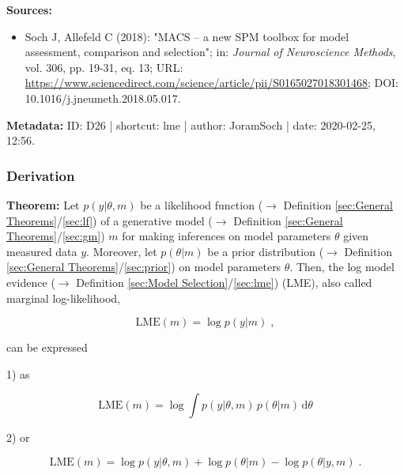 \documentclass[a4paper,12pt,twoside]{book}
\begin{document}
\vspace{1em}
\textbf{Sources:}
\begin{itemize}
\item Soch J, Allefeld C (2018): "MACS – a new SPM toolbox for model assessment, comparison and selection"; in: \textit{Journal of Neuroscience Methods}, vol. 306, pp. 19-31, eq. 13; URL: \url{https://www.sciencedirect.com/science/article/pii/S0165027018301468}; DOI: 10.1016/j.jneumeth.2018.05.017.
\end{itemize}


\vspace{1em}
\textbf{Metadata:} ID: D26 | shortcut: lme | author: JoramSoch | date: 2020-02-25, 12:56.
\vspace{1em}



\subsubsection[\textbf{Derivation}]{Derivation} \label{sec:lme-der}
\setcounter{equation}{0}

\textbf{Theorem:} Let $p(y \vert \theta,m)$ be a likelihood function ($\rightarrow$ Definition \ref{sec:General Theorems}/\ref{sec:lf}) of a generative model ($\rightarrow$ Definition \ref{sec:General Theorems}/\ref{sec:gm}) $m$ for making inferences on model parameters $\theta$ given measured data $y$. Moreover, let $p(\theta \vert m)$ be a prior distribution ($\rightarrow$ Definition \ref{sec:General Theorems}/\ref{sec:prior}) on model parameters $\theta$. Then, the log model evidence ($\rightarrow$ Definition \ref{sec:Model Selection}/\ref{sec:lme}) (LME), also called marginal log-likelihood,

\begin{equation} \label{eq:lme-der-LME-term}
\mathrm{LME}(m) = \log p(y|m) \; ,
\end{equation}

can be expressed

1) as

\begin{equation} \label{eq:lme-der-LME-marg}
\mathrm{LME}(m) = \log \int p(y|\theta,m) \, p(\theta|m) \, \mathrm{d}\theta
\end{equation}

2) or

\begin{equation} \label{eq:lme-der-LME-bayes}
\mathrm{LME}(m) = \log p(y|\theta,m) + \log p(\theta|m) - \log p(\theta|y,m) \; .
\end{equation}
\end{document}
